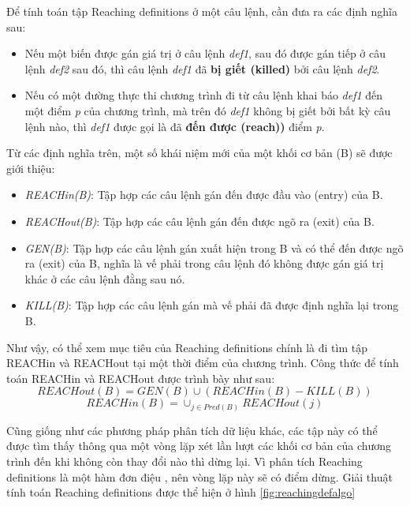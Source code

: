 Để tính toán tập Reaching definitions ở một câu lệnh, cần đưa ra các định nghĩa sau:

\begin{itemize}
	\item Nếu một biến được gán giá trị ở câu lệnh \textit{def1}, sau đó được gán tiếp ở câu lệnh \textit{def2} sau đó, thì câu lệnh \textit{def1} đã \textbf{bị giết (killed)} bởi câu lệnh \textit{def2}.
	\item Nếu có một đường thực thi chương trình đi từ câu lệnh khai báo \textit{def1} đến một điểm \textit{p} của chương trình, mà trên đó \textit{def1} không bị giết bởi bất kỳ câu lệnh nào, thì \textit{def1} được gọi là đã \textbf{đến được (reach))} điểm \textit{p}.
\end{itemize}

Từ các định nghĩa trên, một số khái niệm mới của một khối cơ bản (B) sẽ được giới thiệu:
\begin{itemize}
	\item \textit{REACHin(B)}: Tập hợp các câu lệnh gán đến được đầu vào (entry) của B.
	\item \textit{REACHout(B)}: Tập hợp các câu lệnh gán đến được ngõ ra (exit) của B.
	\item \textit{GEN(B)}: Tập hợp các câu lệnh gán xuất hiện trong B và có thể đến được ngõ ra (exit) của B, nghĩa là vế phải trong câu lệnh đó không được gán giá trị khác ở các câu lệnh đằng sau nó.
	\item \textit{KILL(B)}: Tập hợp các câu lệnh gán mà vế phải đã được định nghĩa lại trong B.
\end{itemize}

Như vậy, có thể xem mục tiêu của Reaching definitions chính là đi tìm tập REACHin và REACHout tại một thời điểm của chương trình. Công thức để tính toán REACHin và REACHout được trình bày như sau:
\begin{equation} \label{eq:reachout}
REACHout(B) = GEN(B) \cup (REACHin(B)-KILL(B))
\end{equation}	
\begin{equation} \label{eq:reachin}
REACHin(B) = \cup_{j \in Pred(B)} REACHout(j)
\end{equation}	

Cũng giống như các phương pháp phân tích dữ liệu khác, các tập này có thể được tìm thấy thông qua một vòng lặp xét lần lượt các khối cơ bản của chương trình đến khi không còn thay đổi nào thì dừng lại. Vì phân tích Reaching definitions là một hàm đơn điệu \cite{monoreach}, nên vòng lặp này sẽ có điểm dừng. Giải thuật tính toán Reaching definitions được thể hiện ở hình \ref{fig:reachingdefalgo}

